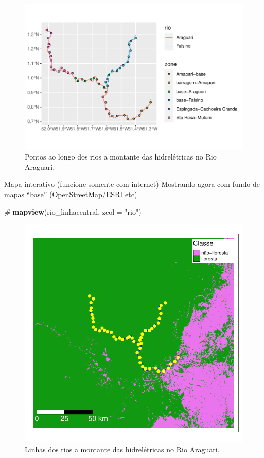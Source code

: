 \documentclass[
]{article}
\newenvironment{Shaded}{\begin{snugshade}}{\end{snugshade}}
\newcommand{\AttributeTok}[1]{\textcolor[rgb]{0.13,0.29,0.53}{#1}}
\newcommand{\CommentTok}[1]{\textcolor[rgb]{0.56,0.35,0.01}{\textit{#1}}}
\newcommand{\FunctionTok}[1]{\textcolor[rgb]{0.13,0.29,0.53}{\textbf{#1}}}
\newcommand{\NormalTok}[1]{#1}
\newcommand{\StringTok}[1]{\textcolor[rgb]{0.31,0.60,0.02}{#1}}
\begin{document}
\begin{figure}
\centering
\includegraphics{epr_files/figure-latex/map-pontod-rio-1.pdf}
\caption{\label{fig:map-pontod-rio}Pontos ao longo dos rios a montante das hidrelétricas no Rio Araguari.}
\end{figure}

Mapa interativo (funcione somente com internet) Mostrando agora com fundo de mapas ``base'' (OpenStreetMap/ESRI etc)

\begin{Shaded}
\begin{Highlighting}[]
\CommentTok{\#}
\FunctionTok{mapview}\NormalTok{(rio\_linhacentral, }\AttributeTok{zcol =} \StringTok{"rio"}\NormalTok{) }
\end{Highlighting}
\end{Shaded}

\begin{figure}
\centering
\includegraphics{epr_files/figure-latex/unnamed-chunk-12-1.pdf}
\caption{\label{fig:unnamed-chunk-12}Linhas dos rios a montante das hidrelétricas no Rio Araguari.}
\end{figure}
\end{document}
